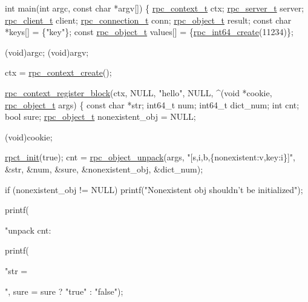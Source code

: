 \begin{DoxyCodeInclude}
\textcolor{keywordtype}{int}
main(\textcolor{keywordtype}{int} argc, \textcolor{keyword}{const} \textcolor{keywordtype}{char} *argv[])
\{
    \hyperlink{service_8h_a55087f28cb63ff45b6c798a5dabaedd7}{rpc\_context\_t} ctx;
    \hyperlink{server_8h_a46fd27cbcf75a54103df9d51d90a7fca}{rpc\_server\_t} server;
    \hyperlink{client_8h_a4f7230a0c2c07d27a07a88d407a06b70}{rpc\_client\_t} client;
    \hyperlink{connection_8h_a70838cb106c3464db299522c5fe2782d}{rpc\_connection\_t} conn;
    \hyperlink{object_8h_ab365f726b4975c0c8376b808d111d01b}{rpc\_object\_t} result;
    \textcolor{keyword}{const} \textcolor{keywordtype}{char} *keys[] = \{\textcolor{stringliteral}{"key"}\};
    \textcolor{keyword}{const} \hyperlink{object_8h_ab365f726b4975c0c8376b808d111d01b}{rpc\_object\_t} values[] = \{\hyperlink{object_8h_a8c515bb8b1add8dbe86e615f048182a2}{rpc\_int64\_create}(11234)\};

    (void)argc;
    (void)argv;

    ctx = \hyperlink{service_8h_aa53a346b1f60759fabc2f047e75fdb90}{rpc\_context\_create}();

    \hyperlink{service_8h_ac0a7c2d5e6bb7464de61d346f97c0b04}{rpc\_context\_register\_block}(ctx, NULL, \textcolor{stringliteral}{"hello"}, NULL,
        ^(\textcolor{keywordtype}{void} *cookie, \hyperlink{object_8h_ab365f726b4975c0c8376b808d111d01b}{rpc\_object\_t} args) \{
        \textcolor{keyword}{const} \textcolor{keywordtype}{char} *str;
        int64\_t num;
        int64\_t dict\_num;
        \textcolor{keywordtype}{int} cnt;
        \textcolor{keywordtype}{bool} sure;
        \hyperlink{object_8h_ab365f726b4975c0c8376b808d111d01b}{rpc\_object\_t} nonexistent\_obj = NULL;

        (void)cookie;

        \hyperlink{typing_8h_a62ae3e30a3b7c5accf5e2f2f710a65f9}{rpct\_init}(\textcolor{keyword}{true});
        cnt = \hyperlink{object_8h_a6ff01b9e6d71ba03e2dff76ede7366f6}{rpc\_object\_unpack}(args, \textcolor{stringliteral}{"[s,i,b,\{nonexistent:v,key:i\}]"},
            &str, &num, &sure, &nonexistent\_obj, &dict\_num);

        \textcolor{keywordflow}{if} (nonexistent\_obj != NULL)
            printf(\textcolor{stringliteral}{"Nonexistent obj shouldn't be initialized"});

        printf(\textcolor{stringliteral}{"unpack cnt: %

        printf(\textcolor{stringliteral}{"str = %
            \textcolor{stringliteral}{", sure = %
            sure ? \textcolor{stringliteral}{"true"} : \textcolor{stringliteral}{"false"});

}}}
\end{DoxyCodeInclude}
